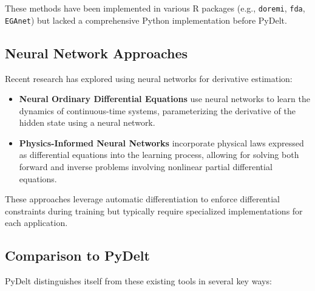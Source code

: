 \documentclass[11pt,a4paper]{article}
\begin{document}
These methods have been implemented in various R packages (e.g., \texttt{doremi}, \texttt{fda}, \texttt{EGAnet}) but lacked a comprehensive Python implementation before PyDelt.

\subsection{Neural Network Approaches}

Recent research has explored using neural networks for derivative estimation:

\begin{itemize}
    \item \textbf{Neural Ordinary Differential Equations} \citep{chen2018neural} use neural networks to learn the dynamics of continuous-time systems, parameterizing the derivative of the hidden state using a neural network.
    
    \item \textbf{Physics-Informed Neural Networks} \citep{raissi2019physics} incorporate physical laws expressed as differential equations into the learning process, allowing for solving both forward and inverse problems involving nonlinear partial differential equations.
\end{itemize}

These approaches leverage automatic differentiation to enforce differential constraints during training but typically require specialized implementations for each application.

\subsection{Comparison to PyDelt}

PyDelt distinguishes itself from these existing tools in several key ways:
\end{document}
